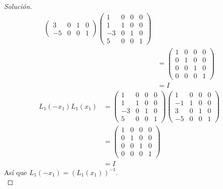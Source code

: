 \documentclass[12pt]{book}
\newenvironment{solucion}
  {\renewcommand\qedsymbol{$\square$}\begin{proof}[Solución]}
  {\end{proof}}
\begin{document}
\begin{solucion}
\begin{align*}
\begin{pmatrix}
    3 & 0 & 1 & 0\\
    -5 & 0 & 0 & 1
    \end{pmatrix}\begin{pmatrix}
    1 & 0 & 0 & 0\\
    1 & 1 & 0 & 0\\
    -3 & 0 & 1 & 0\\
    5 & 0 & 0 & 1
    \end{pmatrix}\\[8pt]
    &=\begin{pmatrix}
    1 & 0 & 0 & 0\\
    0 & 1 & 0 & 0\\
    0 & 0 & 1 & 0\\
    0 & 0 & 0 & 1
    \end{pmatrix}\\[8pt]
    &=I
\end{align*}
\begin{align*}
    L_1(-x_1)L_1(x_1)&=\begin{pmatrix}
    1 & 0 & 0 & 0\\
    1 & 1 & 0 & 0\\
    -3 & 0 & 1 & 0\\
    5 & 0 & 0 & 1
    \end{pmatrix}\begin{pmatrix}
    1 & 0 & 0 & 0\\
    -1 & 1 & 0 & 0\\
    3 & 0 & 1 & 0\\
    -5 & 0 & 0 & 1
    \end{pmatrix}\\[8pt]
    &=\begin{pmatrix}
    1 & 0 & 0 & 0\\
    0 & 1 & 0 & 0\\
    0 & 0 & 1 & 0\\
    0 & 0 & 0 & 1
    \end{pmatrix}\\
    &=I
\end{align*}
Así que $L_1(-x_1)=\left(L_1(x_1)\right)^{-1}$.\\


\end{solucion}
\end{document}
